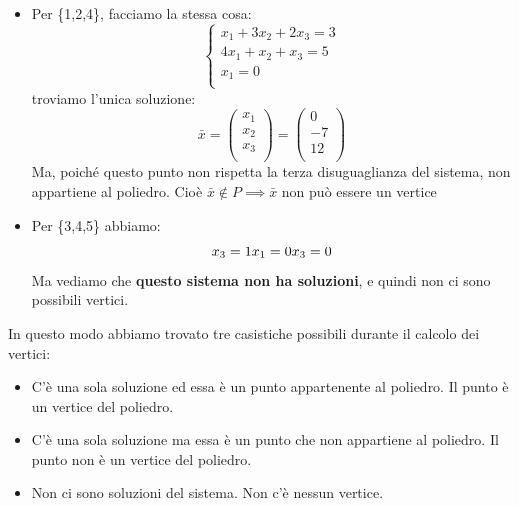 \begin{enumerate}
\begin{itemize}
            
        \item Per \{1,2,4\}, facciamo la stessa cosa:
        \begin{equation*}
            \begin{cases}
            \text{$x_1 + 3x_2 + 2x_3 = 3$}\\
            \text{$4x_1 + x_2 + x_3 = 5$}\\
            \text{$x_1 = 0$}\\
        \end{cases}
        \end{equation*}
        troviamo l'unica soluzione:
        \begin{equation*}
            \bar{x} = \begin{pmatrix}
                x_1\\
                x_2\\
                x_3\\
            \end{pmatrix} = \begin{pmatrix}
                0\\
                -7\\
                12\\
            \end{pmatrix}
        \end{equation*}
        Ma, poiché questo punto non rispetta la terza disuguaglianza del sistema, non appartiene al poliedro. Cioè $\bar{x} \notin P \implies \bar{x}$ non può essere un vertice
        
        \item Per \{3,4,5\} abbiamo:
        \begin{equation*}
            \text{$x_3 = 1$}\\
            \text{$x_1 = 0$}\\
            \text{$x_3 = 0$}\\
        \end{equation*}
        Ma vediamo che \textbf{questo sistema non ha soluzioni}, e quindi non ci sono possibili vertici.
    \end{itemize}
\end{enumerate}
In questo modo abbiamo trovato tre casistiche possibili durante il calcolo dei vertici:
\begin{itemize}
    \item C'è una sola soluzione ed essa è un punto appartenente al poliedro. Il punto è un vertice del poliedro.
    \item C'è una sola soluzione ma essa è un punto che non appartiene al poliedro. Il punto non è un vertice del poliedro.
    \item Non ci sono soluzioni del sistema. Non c'è nessun vertice.
\end{itemize}


